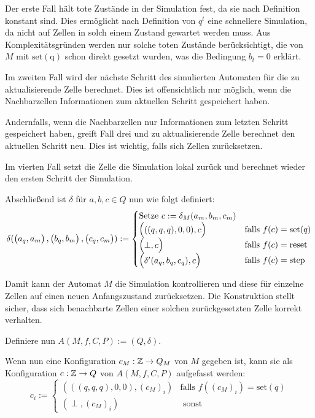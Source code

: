 \begin{definition}
    Der erste Fall hält tote Zustände in der Simulation fest, da sie nach Definition konstant sind. Dies ermöglicht nach Definition von $q^t$ eine schnellere Simulation, da nicht auf Zellen in solch einem Zustand gewartet werden muss. Aus Komplexitätsgründen werden nur solche toten Zustände berücksichtigt, die von $M$ mit $\mathrm{set(q)}$ schon direkt gesetzt wurden, was die Bedingung $b_t = 0$ erklärt.
    
    Im zweiten Fall wird der nächste Schritt des simulierten Automaten für die zu aktualisierende Zelle berechnet.
    Dies ist offensichtlich nur möglich, wenn
    die Nachbarzellen Informationen zum aktuellen Schritt gespeichert haben.
    
    Andernfalls, wenn die Nachbarzellen nur Informationen zum letzten Schritt gespeichert haben, greift Fall drei und zu aktualisierende Zelle berechnet den aktuellen Schritt neu.
    Dies ist wichtig, falls sich Zellen zurücksetzen.
    
    Im vierten Fall setzt die Zelle die Simulation
    lokal zurück und berechnet wieder den ersten Schritt der Simulation.
    
    
    Abschließend ist $\delta$ für $a, b, c \in Q$ nun wie folgt definiert:
    \[
        \delta(\Spvek{a_q, a_m}, \Spvek{b_q, b_m}, \Spvek{c_q, c_m}) := 
        \begin{cases}
            \text{Setze } c := \delta_M(a_m, b_m, c_m) \\
            \Spvek{((q, q, q), 0, 0), c} & \text{falls } f(c) = \mathrm{set}(q) \\
            \Spvek{\perp, c} & \text{falls } f(c) = \mathrm{reset} \\
            \Spvek{\delta'(a_q, b_q, c_q), c} & \text{falls } f(c) = \mathrm{step}
        \end{cases}
    \]
    
    Damit kann der Automat $M$ die Simulation kontrollieren
    und diese für einzelne Zellen auf einen neuen Anfangszustand zurücksetzen. Die Konstruktion stellt sicher,
    dass sich benachbarte Zellen einer solchen zurückgesetzten Zelle
    korrekt verhalten.
    
    Definiere nun $A(M, f, C, P) := (Q, \delta)$.
    
    Wenn nun eine Konfiguration $c_M : \mathbb{Z} \to Q_M$ von $M$
    gegeben ist, kann sie als Konfiguration $c: \mathbb{Z} \to Q$ von $A(M, f, C, P)$
    aufgefasst werden:
    \[
        c_i :=
        \begin{cases}
            (((q, q, q), 0, 0), (c_M)_i) & \text{falls } f((c_M)_i) = \mathrm{set}(q) \\
            (\perp, (c_M)_i) & \text{ sonst}
        \end{cases}
    \]
\end{definition}

